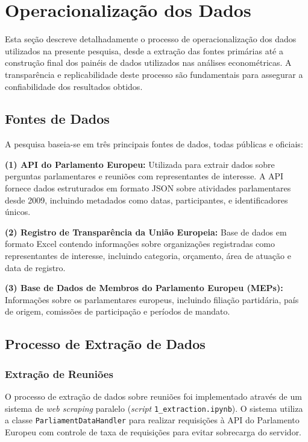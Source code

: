 \section{Operacionalização dos Dados}
\label{sec:operacionalizacao}

Esta seção descreve detalhadamente o processo de operacionalização dos dados utilizados na presente pesquisa, desde a extração das fontes primárias até a construção final dos painéis de dados utilizados nas análises econométricas. A transparência e replicabilidade deste processo são fundamentais para assegurar a confiabilidade dos resultados obtidos.

\subsection{Fontes de Dados}

A pesquisa baseia-se em três principais fontes de dados, todas públicas e oficiais:

\textbf{(1) API do Parlamento Europeu:} Utilizada para extrair dados sobre perguntas parlamentares e reuniões com representantes de interesse. A API fornece dados estruturados em formato JSON sobre atividades parlamentares desde 2009, incluindo metadados como datas, participantes, e identificadores únicos.

\textbf{(2) Registro de Transparência da União Europeia:} Base de dados em formato Excel contendo informações sobre organizações registradas como representantes de interesse, incluindo categoria, orçamento, área de atuação e data de registro.

\textbf{(3) Base de Dados de Membros do Parlamento Europeu (MEPs):} Informações sobre os parlamentares europeus, incluindo filiação partidária, país de origem, comissões de participação e períodos de mandato.

\subsection{Processo de Extração de Dados}

\subsubsection{Extração de Reuniões}

O processo de extração de dados sobre reuniões foi implementado através de um sistema de \textit{web scraping} paralelo (\textit{script} \texttt{1\_extraction.ipynb}). O sistema utiliza a classe \texttt{ParliamentDataHandler} para realizar requisições à API do Parlamento Europeu com controle de taxa de requisições para evitar sobrecarga do servidor.

